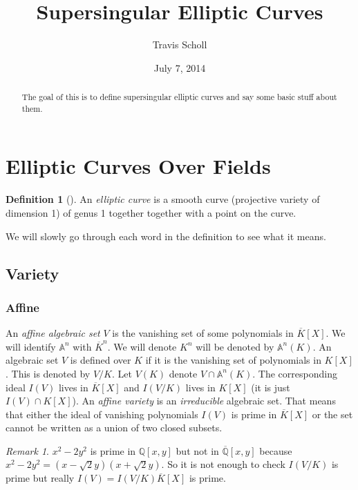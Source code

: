 \documentclass[11pt]{article}
\newcommand{\mytitle}{Supersingular Elliptic Curves}
\newcommand{\myauthor}{Travis Scholl}
\newcommand{\BB}[1]{\mathbb{#1}} %
\newcommand{\QQ}{\BB{Q}}
\renewcommand{\AA}{\BB{A}} %
\theoremstyle{plain}%
\theoremstyle{definition}
\newtheorem{defn}[thm]{Definition}
\theoremstyle{remark}
\newtheorem{rem}[thm]{Remark}
\begin{document}
\title{\bfseries\mytitle}
\author{\sc \myauthor }
\date{July 7, 2014}
\maketitle

\begin{abstract}
	The goal of this is to define supersingular elliptic curves and say some basic stuff about them.
\end{abstract}

\section{Elliptic Curves Over Fields}

\begin{defn}[{\cite[III.3, p 59]{silverman1}}]
	An \emph{elliptic curve} is a smooth curve (projective variety of dimension 1) of genus 1 together together with a point on the curve.
\end{defn}

We will slowly go through each word in the definition to see what it means.

\subsection{Variety}

\subsubsection{Affine}

An \emph{affine algebraic set} $V$ is the vanishing set of some polynomials in $\overline{K}[X]$. We will identify $\AA^n$ with $\overline{K}^n$. We will denote $K^n$ will be denoted by $\AA^n(K)$. An algebraic set $V$ is defined over $K$ if it is the vanishing set of polynomials in $K[X]$. This is denoted by $V/K$. Let $V(K)$ denote $V \cap\AA^n(K)$. The corresponding ideal $I(V)$ lives in $\overline{K}[X]$ and $I(V/K)$ lives in $K[X]$ (it is just $I(V)\cap K[X]$). An \emph{affine variety} is an \emph{irreducible} algebraic set. That means that either the ideal of vanishing polynomials $I(V)$ is prime in $\overline{K}[X]$ or the set cannot be written as a union of two closed subsets.

\begin{rem}
	$x^2-2y^2$ is prime in $\QQ[x,y]$ but not in $\overline{\QQ}[x,y]$ because $x^2-2y^2 = (x-\sqrt{2}y)(x+\sqrt{2}y)$. So it is not enough to check $I(V/K)$ is prime but really $I(V) = I(V/K)\overline{K}[X]$ is prime.
\end{rem}
\end{document}
